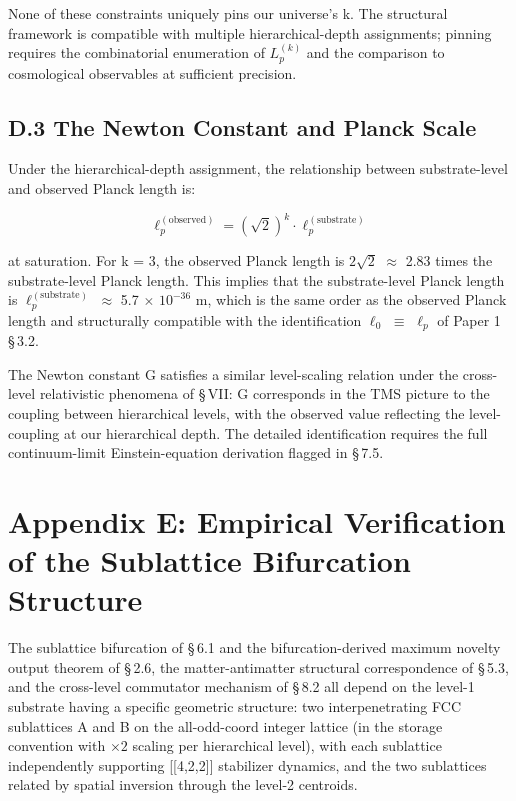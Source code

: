 \documentclass[11pt,oneside]{report}
\theoremstyle{definition}
\theoremstyle{remark}
\begin{document}
None of these constraints uniquely pins our universe's k. The structural
framework is compatible with multiple hierarchical-depth assignments;
pinning requires the combinatorial enumeration of \ensuremath{L_{p}^{(k)}} and the
comparison to cosmological observables at sufficient precision.

\subsection*{D.3 The Newton Constant and Planck Scale}

Under the hierarchical-depth assignment, the relationship between
substrate-level and observed Planck length is:

\begin{equation*}
\ell_{p}^{(\text{observed})} = (\sqrt{2})^{k} \cdot \ell_{p}^{(\text{substrate})}
\end{equation*}

at saturation. For k = 3, the observed Planck length is \ensuremath{2\sqrt{2}} \ensuremath{\approx} 2.83 times
the substrate-level Planck length. This implies that the substrate-level
Planck length is \ensuremath{\ell_{p}^{(\text{substrate})}} \ensuremath{\approx} 5.7 \ensuremath{\times} \ensuremath{10^{-36}} m, which is the same
order as the observed Planck length and structurally compatible with the
identification \ensuremath{\ell_{0}} \ensuremath{\equiv} \ensuremath{\ell_{p}} of Paper 1 \S\,3.2.

The Newton constant G satisfies a similar level-scaling relation under
the cross-level relativistic phenomena of \S\,VII: G corresponds in the TMS
picture to the coupling between hierarchical levels, with the observed
value reflecting the level-coupling at our hierarchical depth. The
detailed identification requires the full continuum-limit
Einstein-equation derivation flagged in \S\,7.5.

\section*{Appendix E: Empirical Verification of the Sublattice Bifurcation Structure}

The sublattice bifurcation of \S\,6.1 and the bifurcation-derived maximum
novelty output theorem of \S\,2.6, the matter-antimatter structural
correspondence of \S\,5.3, and the cross-level commutator mechanism of \S\,8.2
all depend on the level-1 substrate having a specific geometric
structure: two interpenetrating FCC sublattices A and B on the
all-odd-coord integer lattice (in the storage convention with \ensuremath{\times 2} scaling
per hierarchical level), with each sublattice independently supporting
[[4,2,2]] stabilizer dynamics, and the two sublattices related
by spatial inversion through the level-2 centroids.
\end{document}

